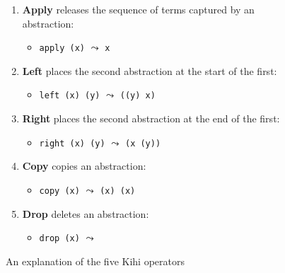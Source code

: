 \begin{figure}
    \renewcommand{\labelitemi}{$\textendash$}
    \begin{enumerate}
        \item \textbf{Apply} releases the sequence of terms captured by an abstraction:
        \begin{itemize}
            \item \lstinline{apply (x)} $\leadsto$ \lstinline{x}
        \end{itemize}

        \item \textbf{Left} places the second abstraction at the start of the first:
        \begin{itemize}
            \item \lstinline{left (x) (y)} $\leadsto$ \lstinline{((y) x)}
        \end{itemize}

        \item \textbf{Right} places the second abstraction at the end of the first:
        \begin{itemize}
            \item \lstinline{right (x) (y)} $\leadsto$ \lstinline{(x (y))}
        \end{itemize}

        \item \textbf{Copy} copies an abstraction:
        \begin{itemize}
            \item \lstinline{copy (x)} $\leadsto$ \lstinline{(x) (x)}
        \end{itemize}

        \item \textbf{Drop} deletes an abstraction:
        \begin{itemize}
            \item \lstinline{drop (x)} $\leadsto$ \lstinline{}
        \end{itemize}
    \end{enumerate}
    \caption{An explanation of the five Kihi operators}
    \label{fig:operator_explanation}
\end{figure}